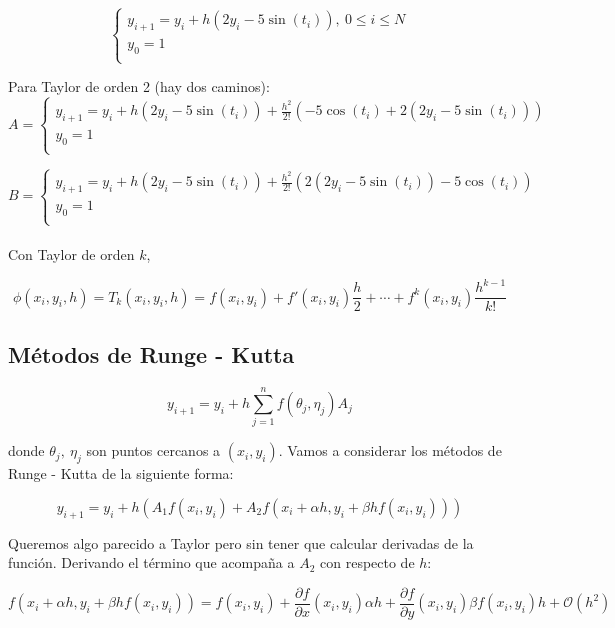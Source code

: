 $$ 
	\begin{cases}
        y_{i + 1} = y_{i} + h(2y_{i} - 5\sin(t_{i})),\ 0 \leq i \leq N\\
        y_{0} = 1\\
    \end{cases}
$$

Para Taylor de orden 2 (hay dos caminos):\\

$$ A = 
	\begin{cases}
        y_{i + 1} = y_{i} + h(2y_{i} - 5\sin(t_{i})) + \frac{h^{2}}{2!}(-5\cos(t_{i}) + 2(2y_{i} - 5\sin(t_{i})))\\
        y_{0} = 1\\
    \end{cases}
$$

$$ B = 
	\begin{cases}
        y_{i + 1} = y_{i} + h(2y_{i} - 5\sin(t_{i})) + \frac{h^{2}}{2!}(2(2y_{i} - 5\sin(t_{i})) - 5\cos(t_{i}))\\
        y_{0} = 1\\
    \end{cases}
$$\\

Con Taylor de orden $k$,

$$\phi(x_{i}, y_{i}, h) = T_{k}(x_{i}, y_{i}, h) = f(x_{i}, y_{i}) + f'(x_{i}, y_{i})\frac{h}{2} + \cdots + f^{k}(x_{i}, y_{i})\frac{h^{k - 1}}{k!}$$

\subsection{M\'etodos de Runge - Kutta}

$$y_{i + 1} = y_{i} + h\sum \limits_{j = 1}^{n} f(\theta_{j}, \eta_{j})A_{j}$$

donde $\theta_{j},\ \eta_{j}$ son puntos cercanos a $(x_{i}, y_{i})$. Vamos a considerar los m\'etodos de Runge - Kutta de la siguiente forma:

$$y_{i + 1} = y_{i} + h(A_{1}f(x_{i}, y_{i}) + A_{2}f(x_{i} + \alpha h, y_{i} + \beta hf(x_{i}, y_{i})))$$

Queremos algo parecido a Taylor pero sin tener que calcular derivadas de la funci\'on. Derivando el t\'ermino que acompa\~na a $A_{2}$ con respecto de $h$:

$$f(x_{i} + \alpha h, y_{i} + \beta hf(x_{i}, y_{i})) = f(x_{i}, y_{i}) + \frac{\partial f}{\partial x}(x_{i}, y_{i})\alpha h + \frac{\partial f}{\partial y}(x_{i}, y_{i})\beta f(x_{i}, y_{i})h + \mathcal{O}(h^{2})$$ 

